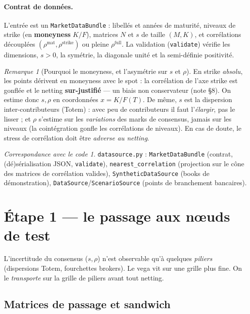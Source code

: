 \documentclass[11pt,a4paper]{article}
\newcommand{\code}[1]{\texttt{#1}}
\theoremstyle{plain}
\theoremstyle{definition}
\theoremstyle{remark}
\newtheorem{remarque}[theoreme]{Remarque}
\newtheorem*{impl}{Correspondance avec le code}
\begin{document}
\paragraph{Contrat de données.} L'entrée est un \code{MarketDataBundle} : libellés et
années de maturité, niveaux de strike (en \textbf{moneyness} $K/F$), matrices $N$ et
$s$ de taille $(M,K)$, et corrélations découplées $(\rho^{\mathrm{mat}},
\rho^{\mathrm{strike}})$ ou pleine $\rho^{\mathrm{full}}$. La validation
(\code{validate}) vérifie les dimensions, $s>0$, la symétrie, la diagonale unité et la
semi-définie positivité.

\begin{remarque}[Pourquoi le moneyness, et l'asymétrie sur $s$ et $\rho$]
En strike \emph{absolu}, les points dérivent en moneyness avec le spot : la
corrélation de l'axe strike est gonflée et le netting \textbf{sur-justifié} --- un
biais non conservateur (note \S8). On estime donc $s,\rho$ en coordonnées $x=K/F(T)$.
De même, $s$ est la dispersion inter-contributeurs (Totem) : avec peu de
contributeurs il faut l'\emph{élargir}, pas le lisser ; et $\rho$ s'estime sur les
\emph{variations} des marks de consensus, jamais sur les niveaux (la cointégration
gonfle les corrélations de niveaux). En cas de doute, le stress de corrélation doit
être \emph{adverse au netting}.
\end{remarque}

\begin{impl}
\code{datasource.py} : \code{MarketDataBundle} (contrat, (dé)sérialisation JSON,
\code{validate}), \code{nearest\_correlation} (projection sur le cône des matrices de
corrélation valides), \code{SyntheticDataSource} (books de démonstration),
\code{DataSource}/\code{ScenarioSource} (points de branchement bancaires).
\end{impl}

\section{Étape 1 --- le passage aux nœuds de test}\label{sec:passage}

L'incertitude du consensus ($s,\rho$) n'est observable qu'à quelques \emph{piliers}
(dispersions Totem, fourchettes brokers). Le vega vit sur une grille plus fine. On le
\emph{transporte} sur la grille de piliers avant tout netting.

\subsection{Matrices de passage et sandwich}
\end{document}
